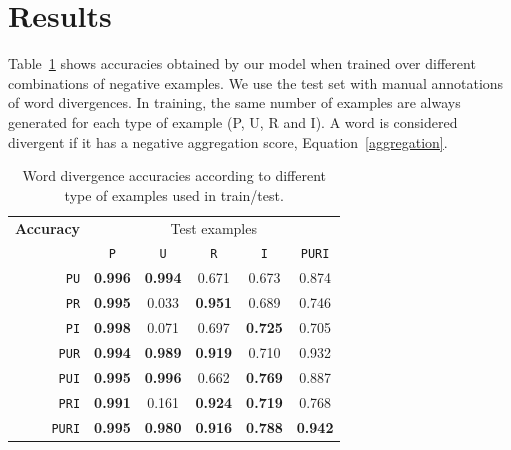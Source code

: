 \documentclass[11pt,a4paper]{article}
\begin{document}
\section{Results}
\label{sec:results}


Table~\ref{results_puri} shows accuracies obtained by our model when trained over different combinations of negative examples.
We use the test set with manual annotations of word divergences.
In training, the same number of examples are always generated for each type of example (P, U, R and I). 
A word is considered divergent if it has a negative aggregation score, Equation~\ref{aggregation}.

\begin{table}[h]
\small
\center
\begin{tabular}{crccccc}
\hline
\multicolumn{2}{l}{\bf Accuracy} & \multicolumn{5}{c}{Test examples} \\
 &  & \texttt{P} & \texttt{U} & \texttt{R} & \texttt{I} & \texttt{PURI} \\
 \hline
\parbox[t]{0mm}{} &  \texttt{PU}     & \bf 0.996 & \bf 0.994 & 0.671 & 0.673 & 0.874 \\
 &  \texttt{PR}     & \bf 0.995 &      0.033 & \bf 0.951 &      0.689 & 0.746 \\
 &  \texttt{PI}       & \bf 0.998 &      0.071 &      0.697 & \bf 0.725 & 0.705 \\
 &  \texttt{PUR}  & \bf 0.994 & \bf 0.989 & \bf 0.919 &      0.710 & 0.932 \\
 &  \texttt{PUI}    & \bf 0.995 & \bf 0.996 &      0.662 & \bf 0.769 & 0.887 \\
 &  \texttt{PRI}    & \bf 0.991 &      0.161 & \bf 0.924 & \bf 0.719 & 0.768 \\
 &  \texttt{PURI} & \bf 0.995 & \bf 0.980 & \bf 0.916 & \bf 0.788 & \bf 0.942 \\
\hline
\end{tabular}
\caption{Word divergence accuracies according to different type of examples used in train/test.}%
\label{results_puri}
\end{table}
\end{document}
